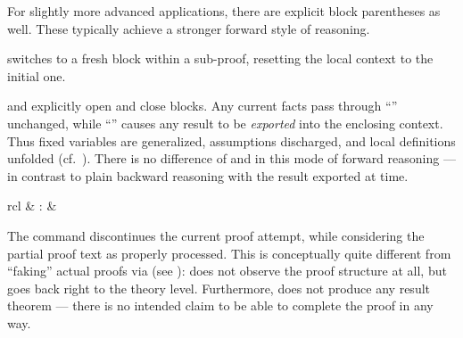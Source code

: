 \begin{isabellebody}
\begin{isamarkuptext}
  For slightly more advanced applications, there are explicit block
  parentheses as well.  These typically achieve a stronger forward
  style of reasoning.

  \begin{description}

  \item \hyperlink{command.next}{\mbox{}} switches to a fresh block within a
  sub-proof, resetting the local context to the initial one.

  \item \hyperlink{command.braceleft}{\mbox{}} and \hyperlink{command.braceright}{\mbox{}} explicitly open and close
  blocks.  Any current facts pass through ``\hyperlink{command.braceleft}{\mbox{}}''
  unchanged, while ``\hyperlink{command.braceright}{\mbox{}}'' causes any result to be
  \emph{exported} into the enclosing context.  Thus fixed variables
  are generalized, assumptions discharged, and local definitions
  unfolded (cf.\ ).  There is no difference
  of \hyperlink{command.assume}{\mbox{}} and \hyperlink{command.presume}{\mbox{}} in this mode of
  forward reasoning --- in contrast to plain backward reasoning with
  the result exported at \hyperlink{command.show}{\mbox{}} time.

  \end{description}%
\end{isamarkuptext}%
\isamarkuptrue%
%
\isamarkuptrue%
%
\begin{isamarkuptext}%
\begin{matharray}{rcl}
    \hypertarget{command.oops}{\hyperlink{command.oops}{\mbox{}}} & : &  \\
  \end{matharray}

  The \hyperlink{command.oops}{\mbox{}} command discontinues the current proof
  attempt, while considering the partial proof text as properly
  processed.  This is conceptually quite different from ``faking''
  actual proofs via \hyperlink{command.sorry}{\mbox{}} (see
  ): \hyperlink{command.oops}{\mbox{}} does not observe the
  proof structure at all, but goes back right to the theory level.
  Furthermore, \hyperlink{command.oops}{\mbox{}} does not produce any result theorem
  --- there is no intended claim to be able to complete the proof
  in any way.


\end{isamarkuptext}
\end{isabellebody}
